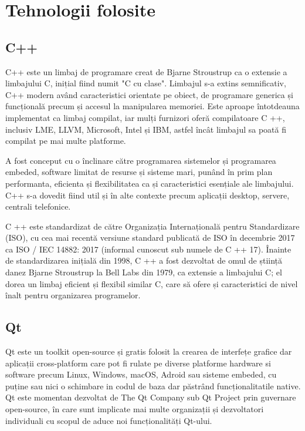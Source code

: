 \newpage
\section{Tehnologii folosite}
\subsection{C++}

C++ este un limbaj de programare creat de Bjarne Stroustrup ca o extensie a limbajului C, inițial fiind numit "C cu clase". 
Limbajul s-a extins semnificativ, C++ modern având caracteristici orientate pe obiect, de programare generica și funcțională 
precum și accesul la manipularea memoriei. Este aproape întotdeauna implementat ca limbaj compilat, iar mulți furnizori oferă 
compilatoare C ++, inclusiv LME, LLVM, Microsoft, Intel și IBM, astfel încât limbajul sa poată fi compilat pe mai multe platforme.\newline 

A fost conceput cu o înclinare către programarea sistemelor și programarea embeded, software limitat de resurse și sisteme mari, 
punând în prim plan performanta, eficienta și flexibilitatea ca și caracteristici esențiale ale limbajului. C++ s-a dovedit 
fiind util și în alte contexte precum aplicații desktop, servere, centrali telefonice.\newline

C ++ este standardizat de către Organizația Internațională pentru Standardizare (ISO), cu cea mai recentă versiune standard 
publicată de ISO în decembrie 2017 ca ISO / IEC 14882: 2017 (informal cunoscut sub numele de C ++ 17). Înainte de standardizarea 
inițială din 1998, C ++ a fost dezvoltat de omul de știință danez Bjarne Stroustrup la Bell Labs din 1979, ca extensie a 
limbajului C; el dorea un limbaj eficient și flexibil similar C, care să ofere și caracteristici de nivel înalt pentru organizarea 
programelor.\newline

\subsection{Qt}

Qt este un toolkit open-source și gratis folosit la crearea de interfețe grafice dar aplicații cross-platform care 
pot fi rulate pe diverse platforme hardware si software precum Linux, Windows, macOS, Adroid sau sisteme embeded, 
cu puține sau nici o schimbare in codul de baza dar păstrând funcționalitatile native. Qt este momentan dezvoltat 
de The Qt Company sub Qt Project prin guvernare open-source, în care sunt implicate mai multe organizații și dezvoltatori 
individuali cu scopul de aduce noi funcționalități Qt-ului.\newline

